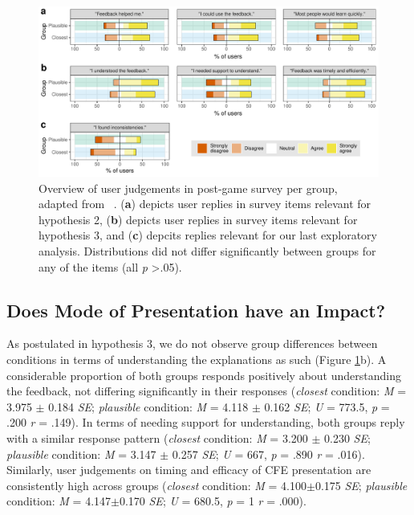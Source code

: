\begin{figure}
   \centering
   \includegraphics[width=\textwidth]{./media/H2_H3_expl_survey_T_PAZ_FINAL.pdf}
   \caption{Overview of user judgements in post-game survey per group, adapted from ~\citep{holzinger_measuring_2020}. (\textbf{a}) depicts user replies in survey items relevant for hypothesis 2, (\textbf{b}) depicts user replies in survey items relevant for hypothesis 3, and (\textbf{c}) depcits replies relevant for our last exploratory analysis. Distributions did not differ significantly between groups for any of the items (all \textit{p} \textgreater .05).}
   \label{fig:survey}
 \end{figure}

\subsection{Does Mode of Presentation have an Impact?}
As postulated in hypothesis 3, we do not observe group differences between conditions in terms of understanding the explanations as such (Figure \ref{fig:survey}b). 
A considerable proportion of both groups responds positively about understanding the feedback, not differing significantly in their responses (\textit{closest} condition: \textit{M} = 3.975 $\pm$ 0.184 \textit{SE}; \textit{plausible} condition: \textit{M} = 4.118 $\pm$ 0.162 \textit{SE}; \textit{U} = 773.5, \textit{p} = .200 \textit{r} = .149).
In terms of needing support for understanding, both groups reply with a similar response pattern (\textit{closest} condition: \textit{M} = 3.200 $\pm$ 0.230 \textit{SE}; \textit{plausible} condition: \textit{M} = 3.147 $\pm$ 0.257 \textit{SE}; \textit{U} = 667, \textit{p} = .890 \textit{r} = .016).
Similarly, user judgements on timing and efficacy of  CFE presentation are consistently high across groups (\textit{closest} condition: \textit{M} = 4.100$\pm$0.175 \textit{SE}; \textit{plausible} condition: \textit{M} = 4.147$\pm$0.170 \textit{SE}; \textit{U} = 680.5, \textit{p} = 1 \textit{r} = .000).

